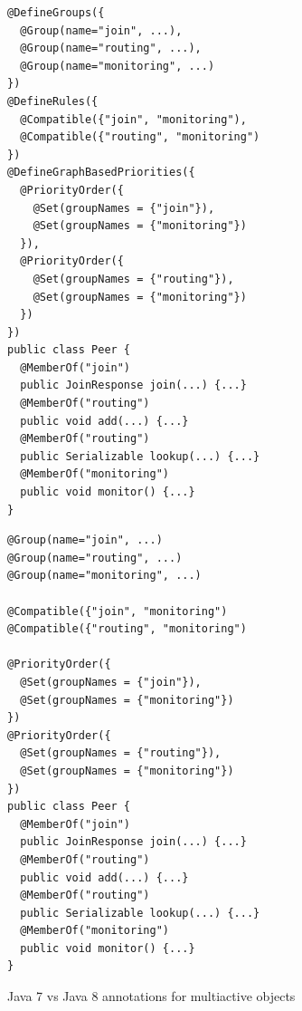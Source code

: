 \documentclass[11pt]{report}
\begin{document}
\begin{figure}[!ht]
	\lstset{language=java, numbers=left, numberstyle=\tiny, stepnumber=1, numbersep=5pt, basicstyle=\footnotesize}
	\begin{minipage}[c]{0.48\textwidth}
	\begin{lstlisting}[frame=single]
@DefineGroups({
  @Group(name="join", ...),
  @Group(name="routing", ...),
  @Group(name="monitoring", ...)
})
@DefineRules({
  @Compatible({"join", "monitoring"),
  @Compatible({"routing", "monitoring")
})
@DefineGraphBasedPriorities({
  @PriorityOrder({
    @Set(groupNames = {"join"}),
    @Set(groupNames = {"monitoring"})
  }),
  @PriorityOrder({
    @Set(groupNames = {"routing"}),
    @Set(groupNames = {"monitoring"})
  })
})
public class Peer {
  @MemberOf("join")
  public JoinResponse join(...) {...}
  @MemberOf("routing")
  public void add(...) {...}
  @MemberOf("routing")
  public Serializable lookup(...) {...}
  @MemberOf("monitoring")
  public void monitor() {...}
}
 	\end{lstlisting}
 	\end{minipage}
 	\hfill
	\begin{minipage}[c]{0.48\textwidth}
	\begin{lstlisting}[frame=single]
@Group(name="join", ...)
@Group(name="routing", ...)
@Group(name="monitoring", ...)

@Compatible({"join", "monitoring")
@Compatible({"routing", "monitoring")

@PriorityOrder({
  @Set(groupNames = {"join"}),
  @Set(groupNames = {"monitoring"})
})
@PriorityOrder({
  @Set(groupNames = {"routing"}),
  @Set(groupNames = {"monitoring"})
})
public class Peer {
  @MemberOf("join")
  public JoinResponse join(...) {...}
  @MemberOf("routing")
  public void add(...) {...}
  @MemberOf("routing")
  public Serializable lookup(...) {...}
  @MemberOf("monitoring")
  public void monitor() {...}
}
	\end{lstlisting}
 	\end{minipage}	
	\caption{Java 7 vs Java 8 annotations for multiactive objects}
	\label{fig:java8}
\end{figure}
\end{document}
